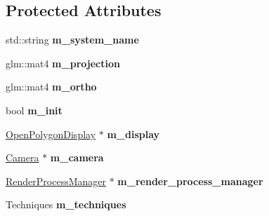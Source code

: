 \subsection*{Protected Attributes}
\begin{DoxyCompactItemize}
\item 
\hypertarget{classEngine_1_1RenderSystem_a69ecd8ab14e787d10dc32b53e1e21868}{}std\+::string {\bfseries m\+\_\+system\+\_\+name}\label{classEngine_1_1RenderSystem_a69ecd8ab14e787d10dc32b53e1e21868}

\item 
\hypertarget{classEngine_1_1RenderSystem_a45ae3752714b7333b2ad3e1497e7eb7a}{}glm\+::mat4 {\bfseries m\+\_\+projection}\label{classEngine_1_1RenderSystem_a45ae3752714b7333b2ad3e1497e7eb7a}

\item 
\hypertarget{classEngine_1_1RenderSystem_ab653743d56979f0e52f2b7a05285695f}{}glm\+::mat4 {\bfseries m\+\_\+ortho}\label{classEngine_1_1RenderSystem_ab653743d56979f0e52f2b7a05285695f}

\item 
\hypertarget{classEngine_1_1RenderSystem_afee785d4940eafb81af24cde5d611a0a}{}bool {\bfseries m\+\_\+init}\label{classEngine_1_1RenderSystem_afee785d4940eafb81af24cde5d611a0a}

\item 
\hypertarget{classEngine_1_1RenderSystem_ac45b3777921d3be67415b49e84e1a016}{}\hyperlink{classEngine_1_1OpenPolygonDisplay}{Open\+Polygon\+Display} $\ast$ {\bfseries m\+\_\+display}\label{classEngine_1_1RenderSystem_ac45b3777921d3be67415b49e84e1a016}

\item 
\hypertarget{classEngine_1_1RenderSystem_ac94142989e64db062909010d63e36ff8}{}\hyperlink{classEngine_1_1Camera}{Camera} $\ast$ {\bfseries m\+\_\+camera}\label{classEngine_1_1RenderSystem_ac94142989e64db062909010d63e36ff8}

\item 
\hypertarget{classEngine_1_1RenderSystem_a806926442339c805a0a277382c09602c}{}\hyperlink{classEngine_1_1RenderProcessManager}{Render\+Process\+Manager} $\ast$ {\bfseries m\+\_\+render\+\_\+process\+\_\+manager}\label{classEngine_1_1RenderSystem_a806926442339c805a0a277382c09602c}

\item 
\hypertarget{classEngine_1_1RenderSystem_a5617269e8b9b814bf6e92b3fc3374258}{}Techniques {\bfseries m\+\_\+techniques}\label{classEngine_1_1RenderSystem_a5617269e8b9b814bf6e92b3fc3374258}

\end{DoxyCompactItemize}



